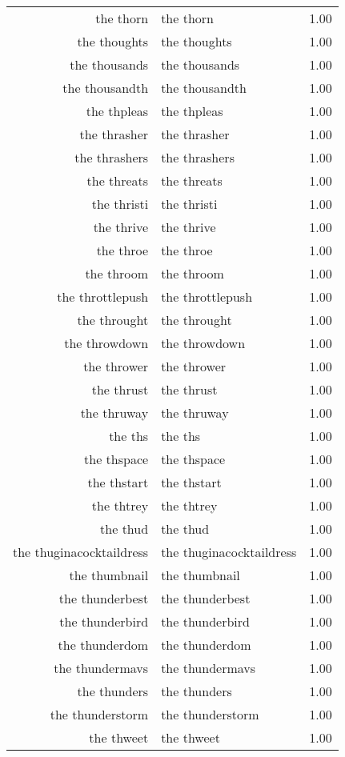 \begin{table}[ht]
\begin{tabular}{rlr}
  the thorn & the thorn & 1.00 \\ 
  the thoughts & the thoughts & 1.00 \\ 
  the thousands & the thousands & 1.00 \\ 
  the thousandth & the thousandth & 1.00 \\ 
  the thpleas & the thpleas & 1.00 \\ 
  the thrasher & the thrasher & 1.00 \\ 
  the thrashers & the thrashers & 1.00 \\ 
  the threats & the threats & 1.00 \\ 
  the thristi & the thristi & 1.00 \\ 
  the thrive & the thrive & 1.00 \\ 
  the throe & the throe & 1.00 \\ 
  the throom & the throom & 1.00 \\ 
  the throttlepush & the throttlepush & 1.00 \\ 
  the throught & the throught & 1.00 \\ 
  the throwdown & the throwdown & 1.00 \\ 
  the thrower & the thrower & 1.00 \\ 
  the thrust & the thrust & 1.00 \\ 
  the thruway & the thruway & 1.00 \\ 
  the ths & the ths & 1.00 \\ 
  the thspace & the thspace & 1.00 \\ 
  the thstart & the thstart & 1.00 \\ 
  the thtrey & the thtrey & 1.00 \\ 
  the thud & the thud & 1.00 \\ 
  the thuginacocktaildress & the thuginacocktaildress & 1.00 \\ 
  the thumbnail & the thumbnail & 1.00 \\ 
  the thunderbest & the thunderbest & 1.00 \\ 
  the thunderbird & the thunderbird & 1.00 \\ 
  the thunderdom & the thunderdom & 1.00 \\ 
  the thundermavs & the thundermavs & 1.00 \\ 
  the thunders & the thunders & 1.00 \\ 
  the thunderstorm & the thunderstorm & 1.00 \\ 
  the thweet & the thweet & 1.00 \\ 

\end{tabular}
\end{table}
